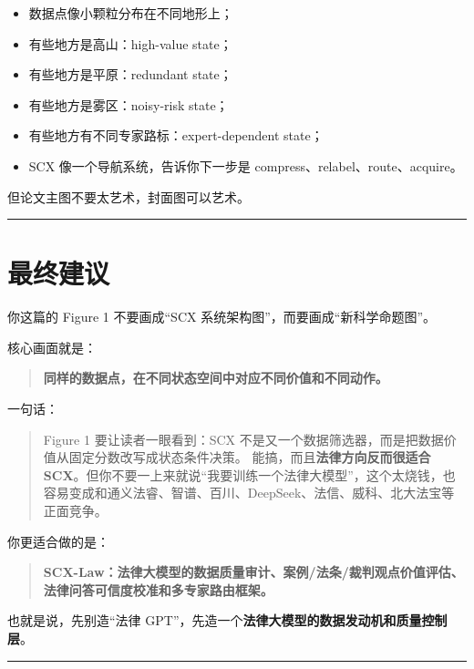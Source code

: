 \documentclass[
  12pt,
]{ctexart}
\providecommand{\tightlist}{%
  \setlength{\itemsep}{0pt}\setlength{\parskip}{0pt}}
\begin{document}
\begin{itemize}
\tightlist
\item
  数据点像小颗粒分布在不同地形上；
\item
  有些地方是高山：high-value state；
\item
  有些地方是平原：redundant state；
\item
  有些地方是雾区：noisy-risk state；
\item
  有些地方有不同专家路标：expert-dependent state；
\item
  SCX 像一个导航系统，告诉你下一步是 compress、relabel、route、acquire。
\end{itemize}

但论文主图不要太艺术，封面图可以艺术。

\begin{center}\rule{0.5\linewidth}{0.5pt}\end{center}

\section{最终建议}\label{ux6700ux7ec8ux5efaux8bae-3}

你这篇的 Figure 1 不要画成``SCX 系统架构图''，而要画成``新科学命题图''。

核心画面就是：

\begin{quote}
\textbf{同样的数据点，在不同状态空间中对应不同价值和不同动作。}
\end{quote}

一句话：

\begin{quote}
Figure 1 要让读者一眼看到：SCX
不是又一个数据筛选器，而是把数据价值从固定分数改写成状态条件决策。
能搞，而且\textbf{法律方向反而很适合
SCX}。但你不要一上来就说``我要训练一个法律大模型''，这个太烧钱，也容易变成和通义法睿、智谱、百川、DeepSeek、法信、威科、北大法宝等正面竞争。
\end{quote}

你更适合做的是：

\begin{quote}
\textbf{SCX-Law：法律大模型的数据质量审计、案例/法条/裁判观点价值评估、法律问答可信度校准和多专家路由框架。}
\end{quote}

也就是说，先别造``法律
GPT''，先造一个\textbf{法律大模型的数据发动机和质量控制层}。

\begin{center}\rule{0.5\linewidth}{0.5pt}\end{center}
\end{document}
